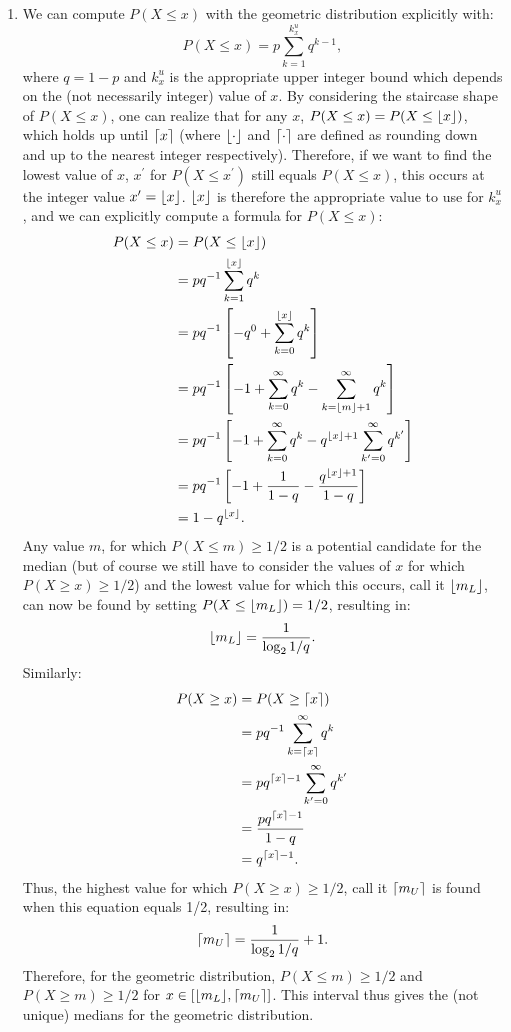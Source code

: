 \begin{problem}{25}
\begin{enumerate}
	\item We can compute $P(X \le x)$ with the geometric distribution explicitly with:
	\begin{equation*}
	P(X \le x) = p \sum_{k=1}^{k^{u}_x}q^{k-1},
	\end{equation*}
where $q=1-p$ and $k^{u}_x$ is the appropriate upper integer bound which depends on the (not necessarily integer) value of $x$.  By considering the staircase shape of $P(X \le x)$, one can realize that for any $x$, $P(X \le x) = P(X \le \lfloor x\rfloor)$, which holds up until $\lceil x\rceil$ (where $\lfloor\cdot\rfloor$ and $\lceil\cdot\rceil$ are defined as rounding down and up to the nearest integer respectively).  Therefore, if we want to find the lowest value of $x$, $x^\prime$ for $P(X \le x^\prime)$ still equals $P(X \le x)$, this occurs at the integer value $x^\prime= \lfloor x\rfloor$.  $\lfloor x\rfloor$ is therefore the appropriate value to use for ${k^{u}_x}$, and we can explicitly compute a formula for $P(X \le x)$:
\begin{align*}
P(X \le x) & = P(X \le \lfloor x\rfloor) \\
&= pq^{-1} \sum_{k=1}^{\lfloor x\rfloor}q^{k}\\
& = pq^{-1} \left[-q^0+\sum_{k=0}^{\lfloor x\rfloor}q^{k} \right] \\
& = pq^{-1}\left [-1 +\sum_{k=0}^{\infty}q^{k} -\sum_{k=\lfloor m\rfloor+1}^{\infty}q^{k} \right] \\
& =  pq^{-1}\left [-1 +\sum_{k=0}^{\infty}q^{k} -q^{\lfloor x\rfloor+1}\sum_{k^\prime = 0}^{\infty}q^{k^\prime} \right] \\
& = pq^{-1}\left [-1 +\frac{1}{1-q} -\frac{q^{\lfloor x\rfloor+1}}{1-q} \right] \\
& = 1-q^{\lfloor x\rfloor}.
\end{align*}
Any value $m$, for which $P(X \le m) \ge 1/2$ is a potential candidate for the median (but of course we still have to consider the values of $x$ for which $P(X \ge x) \ge 1/2$) and the lowest value for which this occurs, call it $\lfloor m_L\rfloor$, can now be found by setting $P(X \le \lfloor m_L\rfloor) = 1/2$, resulting in:
\begin{equation*}
\lfloor m_L\rfloor = \frac{1}{\log_2{1/q}}.
\end{equation*}
Similarly:
\begin{align*}
P(X \ge x) & =P(X \ge \lceil x\rceil) \\
&= pq^{-1} \sum_{k=\lceil x\rceil}^{\infty}q^{k}\\
& = pq^{\lceil x\rceil-1} \sum_{k^\prime = 0}^{\infty}q^{k^\prime} \\
& = \frac{ pq^{\lceil x\rceil-1} }{1-q} \\
& =q^{\lceil x\rceil-1}.
\end{align*}
Thus, the highest value for which $P(X \ge x) \ge 1/2$, call it $\lceil m_U\rceil$ is found when this equation equals 1/2, resulting in:
\begin{equation*}
\lceil m_U\rceil = \frac{1}{\log_2{1/q}}+1.
\end{equation*}
Therefore, for the geometric distribution, $P(X \le m) \ge 1/2$ and $P(X \ge m) \ge 1/2$ for $x\in \left [\lfloor m_L\rfloor, \lceil m_U\rceil \right]$.  This interval thus gives the (not unique) medians for the geometric distribution.


\end{enumerate}
\end{problem}
